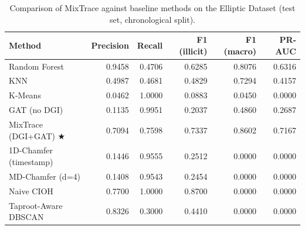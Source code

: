 \begin{table}[!ht]
\centering
\caption{Comparison of MixTrace against baseline methods on the Elliptic Dataset (test set, chronological split).}
\label{tab:main_results}
\begin{tabular}{lrrrrr}
\toprule
Method & Precision & Recall & F1 (illicit) & F1 (macro) & PR-AUC \\
\midrule
Random Forest & 0.9458 & 0.4706 & 0.6285 & 0.8076 & 0.6316 \\
KNN & 0.4987 & 0.4681 & 0.4829 & 0.7294 & 0.4157 \\
K-Means & 0.0462 & 1.0000 & 0.0883 & 0.0450 & 0.0000 \\
\midrule
GAT (no DGI) & 0.1135 & 0.9951 & 0.2037 & 0.4860 & 0.2687 \\
\midrule
MixTrace (DGI+GAT) ★ & 0.7094 & 0.7598 & 0.7337 & 0.8602 & 0.7167 \\
\midrule
1D-Chamfer (timestamp) & 0.1446 & 0.9555 & 0.2512 & 0.0000 & 0.0000 \\
MD-Chamfer (d=4) & 0.1408 & 0.9543 & 0.2454 & 0.0000 & 0.0000 \\
\midrule
Naive CIOH & 0.7700 & 1.0000 & 0.8700 & 0.0000 & 0.0000 \\
Taproot-Aware DBSCAN & 0.8326 & 0.3000 & 0.4410 & 0.0000 & 0.0000 \\
\bottomrule
\end{tabular}
\end{table}